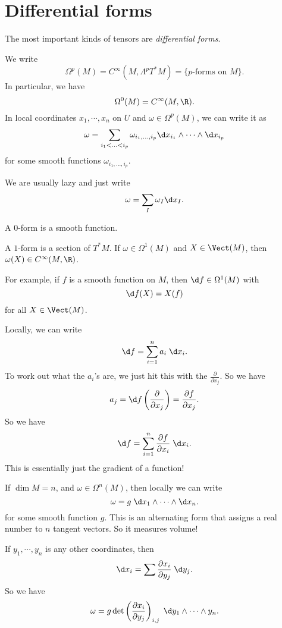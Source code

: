 \documentclass[a4paper]{article}
\begin{document}
\section{Differential forms}

The most important kinds of tensors are \emph{differential forms}.
\begin{defi}
  We write
  \[
    \Omega^p (M) = C^\infty(M, \Lambda^p T^*M) = \{\text{$p$-forms on $M$}\}.
  \]
  In particular, we have
  \[
    \Omega^0(M) = C^\infty(M, \R).
  \]
  In local coordinates $x_1, \cdots, x_n$ on $U$ and $\omega \in \Omega^p(M)$, we can write it as
  \[
    \omega = \sum_{i_1 < \ldots < i_p} \omega_{i_1, \ldots, i_p} \d x_{i_1} \wedge \cdots \wedge \d x_{i_p}
  \]
  for some smooth functions $\omega_{i_1, \ldots, i_p}$.
\end{defi}
We are usually lazy and just write
\[
  \omega = \sum_I \omega_I \d x_I.
\]
\begin{eg}
  A $0$-form is a smooth function.
\end{eg}

\begin{eg}
  A $1$-form is a section of $T^* M$. If $\omega \in \Omega^1(M)$ and $X \in \Vect(M)$, then $\omega(X) \in C^\infty(M, \R)$.

  For example, if $f$ is a smooth function on $M$, then $\d f \in \Omega^1(M)$ with
  \[
    \d f(X) = X(f)
  \]
  for all $X \in \Vect(M)$.

  Locally, we can write
  \[
    \d f = \sum_{i = 1}^n a_i \;\d x_i.
  \]
  To work out what the $a_i$'s are, we just hit this with the $\frac{\partial}{\partial x_j}$. So we have
  \[
    a_j = \d f\left(\frac{\partial}{\partial x_j}\right) = \frac{\partial f}{\partial x_j}.
  \]
  So we have
  \[
    \d f = \sum_{i = 1}^n \frac{\partial f}{\partial x_i}\; \d x_i.
  \]
  This is essentially just the gradient of a function!
\end{eg}

\begin{eg}
  If $\dim M = n$, and $\omega \in \Omega^n(M)$, then locally we can write
  \[
    \omega = g \;\d x_1 \wedge \cdots \wedge \d x_n.
  \]
  for some smooth function $g$. This is an alternating form that assigns a real number to $n$ tangent vectors. So it measures volume!

  If $y_1, \cdots, y_n$ is any other coordinates, then
  \[
    \d x_i = \sum \frac{\partial x_i}{\partial y_j}\; \d y_j.
  \]
  So we have
  \[
    \omega = g \det\left(\frac{\partial x_i}{\partial y_j}\right)_{i, j} \;\d y_1 \wedge \cdots \wedge y_n.
  \]
\end{eg}
\end{document}
